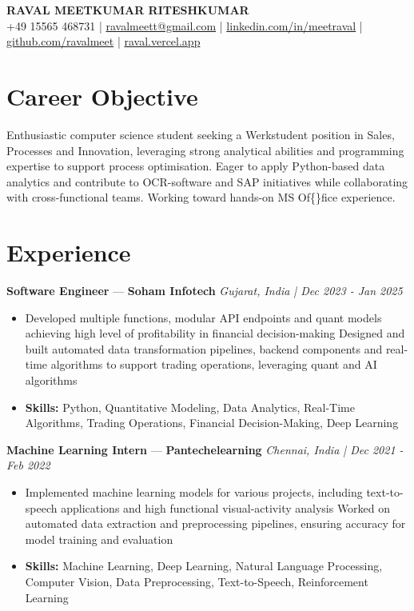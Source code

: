 \documentclass[a4paper,10pt]{article}
\begin{document}
\begin{center}
  {\Large\bfseries RAVAL MEETKUMAR RITESHKUMAR}\\[2pt]
  {\small +49 15565 468731 \;|\; \href{mailto:ravalmeett@gmail.com}{ravalmeett@gmail.com} \;|\; \href{https://www.linkedin.com/in/meetraval/}{linkedin.com/in/meetraval} \;|\; \href{https://github.com/ravalmeet}{github.com/ravalmeet} \;|\; \href{https://raval.vercel.app/}{raval.vercel.app}}
\end{center}
\vspace{-3pt}

\section*{Career Objective}
Enthusiastic computer science student seeking a Werkstudent position in Sales, Processes and Innovation, leveraging strong analytical abilities and programming expertise to support process optimisation. Eager to apply Python-based data analytics and contribute to OCR-software and SAP initiatives while collaborating with cross-functional teams. Working toward hands-on MS Of\{\}fice experience.\par

\section*{Experience}
\textbf{Software Engineer} — \textbf{Soham Infotech} \hfill \textit{Gujarat, India \;|\; Dec 2023 - Jan 2025}\par
\vspace{1pt}
\begin{itemize}
  \item Developed multiple functions, modular API endpoints and quant models achieving high level of profitability in financial decision-making Designed and built automated data transformation pipelines, backend components and real-time algorithms to support trading operations, leveraging quant and AI algorithms
  \item \textbf{Skills:} Python, Quantitative Modeling, Data Analytics, Real-Time Algorithms, Trading Operations, Financial Decision-Making, Deep Learning
\end{itemize}
\vspace{3pt}
\textbf{Machine Learning Intern} — \textbf{Pantechelearning} \hfill \textit{Chennai, India \;|\; Dec 2021 - Feb 2022}\par
\vspace{1pt}
\begin{itemize}
  \item Implemented machine learning models for various projects, including text-to-speech applications and high functional visual-activity analysis Worked on automated data extraction and preprocessing pipelines, ensuring accuracy for model training and evaluation
  \item \textbf{Skills:} Machine Learning, Deep Learning, Natural Language Processing, Computer Vision, Data Preprocessing, Text-to-Speech, Reinforcement Learning
\end{itemize}
\end{document}
